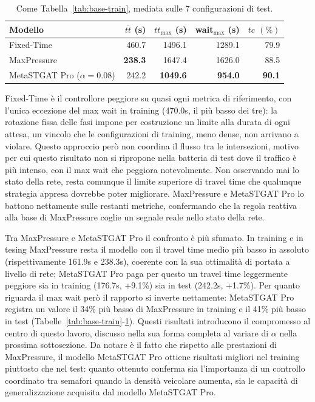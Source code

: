 \begin{table}[htbp]
  \centering
  \begin{tabular}{@{}lrrrr@{}}
    \toprule
    Modello                       & $\overline{tt}$ (s) & $tt_{\max}$ (s) & wait$_{\max}$ (s) & $tc$ $(\%)$   \\
    \midrule
    Fixed-Time                    & 460.7               & 1496.1          & 1289.1            & 79.9          \\
    MaxPressure                   & \textbf{238.3}      & 1647.4          & 1626.0            & 88.5          \\
    MetaSTGAT Pro ($\alpha=0.08$) & 242.2               & \textbf{1049.6} & \textbf{954.0}    & \textbf{90.1} \\
    \bottomrule
  \end{tabular}
  \caption{Come Tabella~\ref{tab:base-train}, mediata sulle 7 configurazioni
    di test.}
  \label{tab:base-test}
\end{table}

Fixed-Time è il controllore peggiore su quasi ogni metrica di riferimento,
con l'unica eccezione del max wait in training (470.0s, il più basso dei tre):
la rotazione fissa delle fasi impone per costruzione un
limite alla durata di ogni attesa, un vincolo che le configurazioni di
training, meno dense, non arrivano a violare.
Questo approccio però non coordina il flusso tra le intersezioni, motivo per cui
questo risultato non si ripropone nella batteria di test dove il traffico è più intenso,
con il max wait che peggiora notevolmente.
Non osservando mai lo stato della rete, resta comunque il limite superiore di
travel time che qualunque strategia appresa dovrebbe poter migliorare.
MaxPressure e MetaSTGAT Pro lo battono nettamente sulle restanti metriche,
confermando che la regola reattiva alla base di MaxPressure coglie un segnale reale nello stato della rete.

Tra MaxPressure e MetaSTGAT Pro il confronto è più sfumato. In training e in tesing MaxPressure
resta il modello con il travel time medio più basso in assoluto (rispettivamente 161.9s e 238.3s),
coerente con la sua ottimalità di portata a livello di rete;
MetaSTGAT Pro paga per questo un travel time leggermente peggiore sia in training (176.7s, +9.1\%) sia in test (242.2s, +1.7\%).
Per quanto riguarda il max wait però il rapporto si inverte nettamente:
MetaSTGAT Pro registra un valore il 34\% più basso di MaxPressure in training e il 41\% più basso in test
(Tabelle~\ref{tab:base-train}-\ref{tab:base-test}).
Questi risultati introducono il compromesso al centro di questo lavoro, discusso nella sua forma
completa al variare di $\alpha$ nella prossima sottosezione.
Da notare è il fatto che rispetto alle prestazioni di MaxPressure, il modello MetaSTGAT Pro
ottiene risultati migliori nel training piuttosto che nel test: quanto ottenuto conferma sia
l'importanza di un controllo coordinato tra semafori quando la densità veicolare aumenta, sia
le capacità di generalizzazione acquisita dal modello MetaSTGAT Pro.

